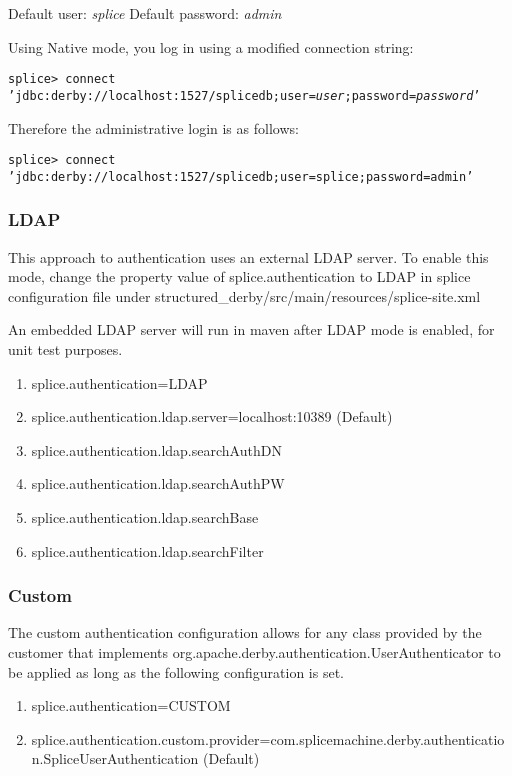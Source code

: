 \documentclass{article}
\begin{document}
Default user:  \emph{splice}	
Default password: \emph{admin}

Using Native mode, you log in using a modified connection string:

\texttt{splice> connect 'jdbc:derby://localhost:1527/splicedb;user=\emph{user};password=\emph{password}'}

Therefore the administrative login is as follows:

\texttt{splice> connect 'jdbc:derby://localhost:1527/splicedb;user=splice;password=admin'}




\subsubsection{LDAP}
This approach to authentication uses an external LDAP server. To enable this mode, change the property value of splice.authentication to LDAP in splice configuration file under structured_derby/src/main/resources/splice-site.xml 

An embedded LDAP server will run in maven after LDAP mode is enabled, for unit test purposes.

\begin{enumerate}
	\item splice.authentication=LDAP
	\item splice.authentication.ldap.server=localhost:10389 (Default)
	\item splice.authentication.ldap.searchAuthDN
	\item splice.authentication.ldap.searchAuthPW
	\item splice.authentication.ldap.searchBase
	\item splice.authentication.ldap.searchFilter
\end{enumerate}

\subsubsection{Custom}

The custom authentication
configuration allows for any
class provided by the customer
that implements org.apache.derby.authentication.UserAuthenticator
to be applied as long as the following configuration is set.

\begin{enumerate}
	\item splice.authentication=CUSTOM
	\item	splice.authentication.custom.provider=com.splicemachine.derby.authentication.SpliceUserAuthentication (Default)
\end{enumerate}
\end{document}
